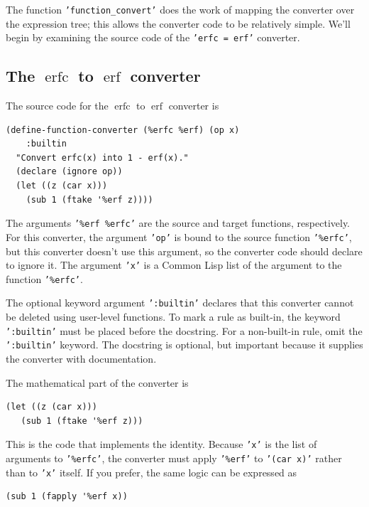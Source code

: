 \documentclass[12pt,fleqn]{extarticle}
\newcommand{\ttq}[1]{\texttt{'#1'}}
\newenvironment{maximabox}
  {\begin{tcolorbox}[
      breakable,
      enhanced,
      colback=white,
      colframe=black!8,
      boxrule=0pt,
      borderline west={2.2pt}{0pt}{black!25},
      arc=1pt,
      left=11pt,
      right=7pt,
      top=9pt,
      bottom=9pt,
      before skip=14pt,
      after skip=14pt
    ]}
  {\end{tcolorbox}}
\DeclareMathOperator{\erf}{erf}
\DeclareMathOperator{\erfc}{erfc}
\begin{document}
The function \ttq{function\_convert} does the work of mapping
the converter over the expression tree; this allows the converter code to be relatively simple.
We'll begin by examining the source code of the \ttq{erfc = erf} converter.

\subsection{The $\erfc$ to $\erf$ converter}

 The source code for the $\erfc$ to $\erf$ converter is 
\begin{maximabox}
\begin{verbatim}
(define-function-converter (%erfc %erf) (op x)
    :builtin
  "Convert erfc(x) into 1 - erf(x)."
  (declare (ignore op))
  (let ((z (car x)))
    (sub 1 (ftake '%erf z))))
\end{verbatim}
\end{maximabox}
The arguments \ttq{\%erf \%erfc} are the source and target functions, 
respectively.  For this converter, the argument \ttq{op} is bound to the source
function \ttq{\%erfc}, but  this converter doesn't use this argument, so the
converter code should declare to ignore it.  The argument \ttq{x} is
a Common Lisp list of the argument to the function \ttq{\%erfc}.

The optional keyword argument  \ttq{:builtin} declares that this converter cannot be
deleted using user-level functions. To mark a rule as built-in, the keyword \ttq{:builtin}  must be placed before the docstring. For a non-built-in rule,  omit the  \ttq{:builtin} keyword.
The docstring is optional, but important because it supplies the converter with documentation. 

The mathematical part of the converter is
\begin{maximabox}
\begin{verbatim}
(let ((z (car x)))
   (sub 1 (ftake '%erf z)))
\end{verbatim}
\end{maximabox}
\noindent This is the code that implements the identity.
Because \ttq{x} is the list of arguments to \ttq{\%erfc}, the converter must apply \ttq{\%erf} to \ttq{(car x)} rather than to \ttq{x} itself. If you prefer, the same logic can be expressed as
\begin{maximabox}
\begin{verbatim}
(sub 1 (fapply '%erf x))
\end{verbatim}
\end{maximabox}
\end{document}
